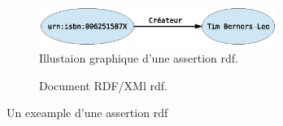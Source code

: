 \begin{figure}[h]
    \centering
    \begin{subfigure}[b]{1\textwidth}
    \centering
    \includegraphics[width=0.85\textwidth]{figs/A/rdf-statement-example-graph.eps}
    \caption{Illustaion graphique d'une assertion \acrshort{rdf}.}
    \label{fig:rdf-statement-example-graph}
    \end{subfigure}

    \begin{subfigure}[b]{1\textwidth}
      \centering
      
      \caption{Document RDF/XMl \acrshort{rdf}.}
      \label{fig:rdf-statement-example-graph}
    \end{subfigure}

    \caption{Un exeample d'une assertion \acrshort{rdf}}
    \label{fig:rdf-statement-example}
\end{figure}
